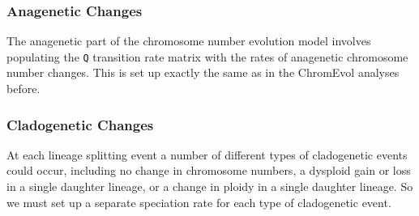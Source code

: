 \subsubsection{Anagenetic Changes}

The anagenetic part of the chromosome number evolution model 
involves populating the \texttt{Q} transition rate matrix
with the rates of anagenetic chromosome number changes.
This is set up exactly the same as in the ChromEvol analyses before.

\subsubsection{Cladogenetic Changes}

At each lineage splitting event a number of different
types of cladogenetic events could occur, including
no change in chromosome numbers,
a dysploid gain or loss in a single daughter lineage, or
a change in ploidy in a single daughter lineage.
So we must set up a separate speciation rate for each type of
cladogenetic event.

